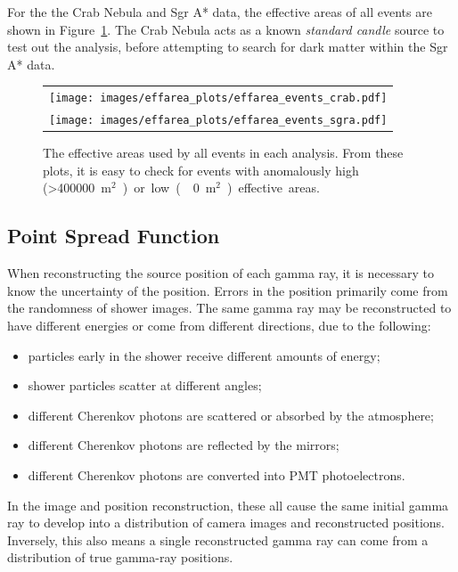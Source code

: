 For the the Crab Nebula and Sgr A* data, the effective areas of all events are shown in Figure~\ref{fig:effarea_usage}.
The Crab Nebula acts as a known \textit{standard candle} source to test out the analysis, before attempting to search for dark matter within the Sgr A* data.
    
    \begin{figure}[!t]
      \centering
      \begin{tabular}{c}
        \texttt{[image: images/effarea\_plots/effarea\_events\_crab.pdf]} \\
        \texttt{[image: images/effarea\_plots/effarea\_events\_sgra.pdf]}
      \end{tabular}
      \caption[Effective Areas Used]{
      The effective areas used by all events in each analysis.
      From these plots, it is easy to check for events with anomalously high (>\SI{400000}{m${}^2$}) or low (\nicetilde\SI{0}{m${}^2$}) effective areas.
      }
      \label{fig:effarea_usage}
    \end{figure}
  
  \FloatBarrier

  \subsection{Point Spread Function}\label{subsec:psf}

    When reconstructing the source position of each gamma ray, it is necessary to know the uncertainty of the position.
    Errors in the position primarily come from the randomness of shower images.
    The same gamma ray may be reconstructed to have different energies or come from different directions, due to the following:
    
    \begin{itemize}[label=$\bullet$,noitemsep]
      \item particles early in the shower receive different amounts of energy;
      \item shower particles scatter at different angles;
      \item different Cherenkov photons are scattered or absorbed by the atmosphere;
      \item different Cherenkov photons are reflected by the mirrors;
      \item different Cherenkov photons are converted into PMT photoelectrons.
    \end{itemize}
    
    In the image and position reconstruction, these all cause the same initial gamma ray to develop into a distribution of camera images and reconstructed positions.
    Inversely, this also means a single reconstructed gamma ray can come from a distribution of true gamma-ray positions.

